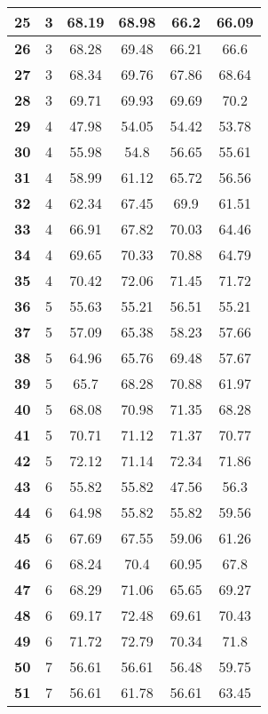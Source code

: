 \begin{longtable}{|c|c|c|c|c|c|}
\textbf{25} & 3 & 68.19 & 68.98 & 66.2 & 66.09 \\ \hline 
\textbf{26} & 3 & 68.28 & 69.48 & 66.21 & 66.6 \\ \hline 
\textbf{27} & 3 & 68.34 & 69.76 & 67.86 & 68.64 \\ \hline 
\textbf{28} & 3 & 69.71 & 69.93 & 69.69 & 70.2 \\ \hline 
\textbf{29} & 4 & 47.98 & 54.05 & 54.42 & 53.78 \\ \hline 
\textbf{30} & 4 & 55.98 & 54.8 & 56.65 & 55.61 \\ \hline 
\textbf{31} & 4 & 58.99 & 61.12 & 65.72 & 56.56 \\ \hline 
\textbf{32} & 4 & 62.34 & 67.45 & 69.9 & 61.51 \\ \hline 
\textbf{33} & 4 & 66.91 & 67.82 & 70.03 & 64.46 \\ \hline 
\textbf{34} & 4 & 69.65 & 70.33 & 70.88 & 64.79 \\ \hline 
\textbf{35} & 4 & 70.42 & 72.06 & 71.45 & 71.72 \\ \hline 
\textbf{36} & 5 & 55.63 & 55.21 & 56.51 & 55.21 \\ \hline 
\textbf{37} & 5 & 57.09 & 65.38 & 58.23 & 57.66 \\ \hline 
\textbf{38} & 5 & 64.96 & 65.76 & 69.48 & 57.67 \\ \hline 
\textbf{39} & 5 & 65.7 & 68.28 & 70.88 & 61.97 \\ \hline 
\textbf{40} & 5 & 68.08 & 70.98 & 71.35 & 68.28 \\ \hline 
\textbf{41} & 5 & 70.71 & 71.12 & 71.37 & 70.77 \\ \hline 
\textbf{42} & 5 & 72.12 & 71.14 & 72.34 & 71.86 \\ \hline 
\textbf{43} & 6 & 55.82 & 55.82 & 47.56 & 56.3 \\ \hline 
\textbf{44} & 6 & 64.98 & 55.82 & 55.82 & 59.56 \\ \hline 
\textbf{45} & 6 & 67.69 & 67.55 & 59.06 & 61.26 \\ \hline 
\textbf{46} & 6 & 68.24 & 70.4 & 60.95 & 67.8 \\ \hline 
\textbf{47} & 6 & 68.29 & 71.06 & 65.65 & 69.27 \\ \hline 
\textbf{48} & 6 & 69.17 & 72.48 & 69.61 & 70.43 \\ \hline 
\textbf{49} & 6 & 71.72 & 72.79 & 70.34 & 71.8 \\ \hline 
\textbf{50} & 7 & 56.61 & 56.61 & 56.48 & 59.75 \\ \hline 
\textbf{51} & 7 & 56.61 & 61.78 & 56.61 & 63.45 \\ \hline 

\end{longtable}
